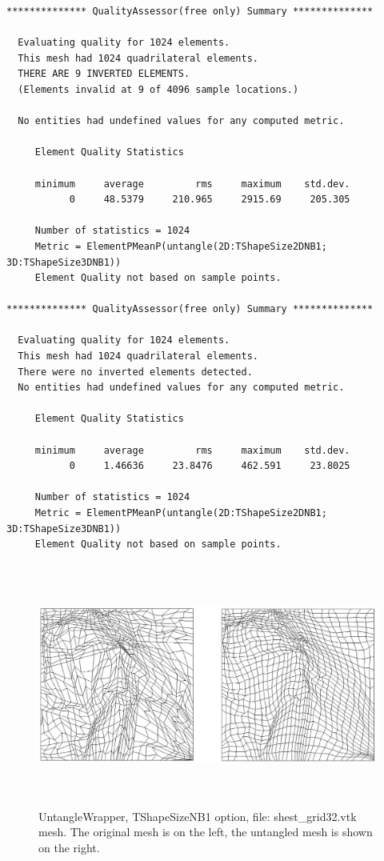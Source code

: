 \begin{verbatim}
************** QualityAssessor(free only) Summary **************

  Evaluating quality for 1024 elements.
  This mesh had 1024 quadrilateral elements.
  THERE ARE 9 INVERTED ELEMENTS.
  (Elements invalid at 9 of 4096 sample locations.)

  No entities had undefined values for any computed metric.

     Element Quality Statistics

     minimum     average         rms     maximum    std.dev.
           0     48.5379     210.965     2915.69     205.305

     Number of statistics = 1024
     Metric = ElementPMeanP(untangle(2D:TShapeSize2DNB1; 3D:TShapeSize3DNB1))
     Element Quality not based on sample points.

************** QualityAssessor(free only) Summary **************

  Evaluating quality for 1024 elements.
  This mesh had 1024 quadrilateral elements.
  There were no inverted elements detected.
  No entities had undefined values for any computed metric.

     Element Quality Statistics

     minimum     average         rms     maximum    std.dev.
           0     1.46636     23.8476     462.591     23.8025

     Number of statistics = 1024
     Metric = ElementPMeanP(untangle(2D:TShapeSize2DNB1; 3D:TShapeSize3DNB1))
     Element Quality not based on sample points.
\end{verbatim}


\begin{figure}[htbp]
\begin{center}
    \includegraphics[height=80mm]{shest_grid32.eps}
    \caption{UntangleWrapper, TShapeSizeNB1 option, file: shest\_grid32.vtk mesh. The original mesh is on the left, the untangled mesh is shown on the right.}
    \label{fig:shest_grid32}
\end{center}
\end{figure}

